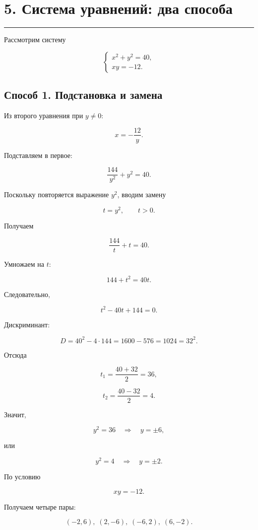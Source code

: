\documentclass[a4paper,12pt]{article}
\newcommand{\topicline}{
    \textcolor{accent}{\rule{\linewidth}{0.6pt}}
}
\begin{document}
\clearpage


\section*{5. Система уравнений: два способа}
\topicline

Рассмотрим систему

\[
\begin{cases}
x^2+y^2=40,\\
xy=-12.
\end{cases}
\]

\subsection*{Способ 1. Подстановка и замена}

Из второго уравнения при $y\ne0$:

\[
x=-\frac{12}{y}.
\]

Подставляем в первое:

\[
\frac{144}{y^2}+y^2=40.
\]

Поскольку повторяется выражение $y^2$, вводим замену

\[
t=y^2,
\qquad
t>0.
\]

Получаем

\[
\frac{144}{t}+t=40.
\]

Умножаем на $t$:

\[
144+t^2=40t.
\]

Следовательно,

\[
t^2-40t+144=0.
\]

Дискриминант:

\[
D=
40^2-4\cdot144
=
1600-576
=
1024
=
32^2.
\]

Отсюда

\[
t_1=
\frac{40+32}{2}
=
36,
\]

\[
t_2=
\frac{40-32}{2}
=
4.
\]

Значит,

\[
y^2=36
\quad\Longrightarrow\quad
y=\pm6,
\]

или

\[
y^2=4
\quad\Longrightarrow\quad
y=\pm2.
\]

По условию

\[
xy=-12.
\]

Получаем четыре пары:

\[
\boxed{
(-2,6),\;
(2,-6),\;
(-6,2),\;
(6,-2)
}.
\]
\end{document}
